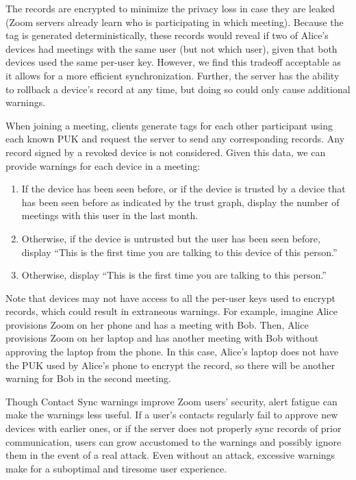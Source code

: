 The records are encrypted to minimize the privacy loss in case they are leaked (Zoom servers already
learn who is participating in which meeting). Because the tag is generated deterministically, these
records would reveal if two of Alice's devices had meetings with the same user (but not which user),
given that both devices used the same per-user key. However, we find this tradeoff acceptable as it
allows for a more efficient synchronization. Further, the server has the ability to rollback a
device's record at any time, but doing so could only cause additional warnings.

When joining a meeting, clients generate tags for each other participant using each known PUK and
request the server to send any corresponding records. Any record signed by a revoked device is not
considered. Given this data, we can provide warnings for each device in a meeting:
\begin{enumerate}
\item If the device has been seen before, or if the device is trusted by a device that has been seen
    before as indicated by the trust graph, display the number of meetings with this user in the
    last month.
\item Otherwise, if the device is untrusted but the user has been seen before, display ``This is the
    first time you are talking to this device of this person.''
\item Otherwise, display ``This is the first time you are talking to this person.''
\end{enumerate}

Note that devices may not have access to all the per-user keys used to encrypt records, which could
result in extraneous warnings. For example, imagine Alice provisions Zoom on her phone and has a
meeting with Bob. Then, Alice provisions Zoom on her laptop and has another meeting with Bob without
approving the laptop from the phone. In this case, Alice's laptop does not have the PUK used by
Alice's phone to encrypt the record, so there will be another warning for Bob in the second meeting.

Though Contact Sync warnings improve Zoom users' security, alert fatigue can make the warnings less
useful. If a user's contacts regularly fail to approve new devices with earlier ones, or if the
server does not properly sync records of prior communication, users can grow accustomed to the
warnings and possibly ignore them in the event of a real attack. Even without an attack, excessive
warnings make for a suboptimal and tiresome user experience.
